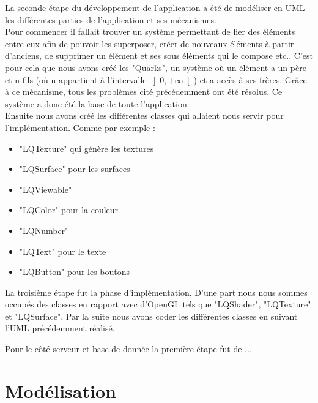 \documentclass{report}
\begin{document}
La seconde étape du développement de l'application a été de modéliser en UML les différentes parties de l'application et ses mécanismes. \\
Pour commencer il fallait trouver un système permettant de lier des éléments entre eux afin de pouvoir les superposer, créer de nouveaux éléments à partir d'anciens, de supprimer un élément et ses sous éléments qui le compose etc..
C'est pour cela que nous avons créé les "Quarks", un système où un élément a un  père et n fils (où n appartient à l'intervalle \(\left]0, +\infty\right[\)) et a accès à ses frères. Grâce à ce mécanisme, tous les problèmes cité précédemment ont été résolus. Ce système a donc été la base de toute l'application. \\
Ensuite nous avons créé les différentes classes qui allaient nous servir pour l'implémentation. Comme par exemple : 
\begin{itemize}
    \item "LQTexture" qui génère les textures
    \item "LQSurface" pour les surfaces
    \item "LQViewable" 
    \item "LQColor" pour la couleur
    \item "LQNumber" 
    \item "LQText" pour le texte
    \item "LQButton" pour les boutons 
\end{itemize}

La troisième étape fut la phase d'implémentation. D'une part nous nous sommes occupés des classes en rapport avec d'OpenGL tels que "LQShader", "LQTexture" et "LQSurface".
Par la suite nous avons coder les différentes classes en suivant l'UML précédemment réalisé.

Pour le côté serveur et base de donnée la première étape fut de ...

\section{Modélisation} %
\end{document}
